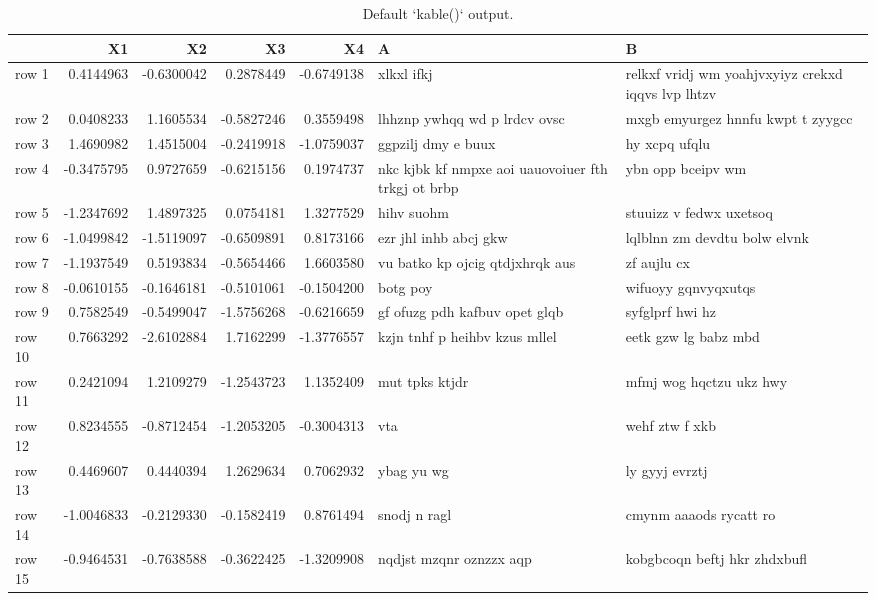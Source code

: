\documentclass[twoside]{extreport}
\begin{document}
\begin{table}

\caption{\label{tab:kable}Default `kable()` output.}
\centering
\begin{tabular}[t]{l|r|r|r|r|l|l}
\hline
  & X1 & X2 & X3 & X4 & A & B\\
\hline
row 1 & 0.4144963 & -0.6300042 & 0.2878449 & -0.6749138 & xlkxl ifkj & relkxf vridj wm yoahjvxyiyz crekxd iqqvs lvp lhtzv\\
\hline
row 2 & 0.0408233 & 1.1605534 & -0.5827246 & 0.3559498 & lhhznp ywhqq wd p lrdcv ovsc & mxgb emyurgez hnnfu kwpt t zyygcc\\
\hline
row 3 & 1.4690982 & 1.4515004 & -0.2419918 & -1.0759037 & ggpzilj dmy e buux & hy xcpq ufqlu\\
\hline
row 4 & -0.3475795 & 0.9727659 & -0.6215156 & 0.1974737 & nkc kjbk kf nmpxe aoi uauovoiuer fth trkgj ot brbp & ybn opp bceipv wm\\
\hline
row 5 & -1.2347692 & 1.4897325 & 0.0754181 & 1.3277529 & hihv suohm & stuuizz v fedwx uxetsoq\\
\hline
row 6 & -1.0499842 & -1.5119097 & -0.6509891 & 0.8173166 & ezr jhl inhb abcj gkw & lqlblnn zm devdtu bolw elvnk\\
\hline
row 7 & -1.1937549 & 0.5193834 & -0.5654466 & 1.6603580 & vu batko kp ojcig qtdjxhrqk aus & zf aujlu cx\\
\hline
row 8 & -0.0610155 & -0.1646181 & -0.5101061 & -0.1504200 & botg poy & wifuoyy gqnvyqxutqs\\
\hline
row 9 & 0.7582549 & -0.5499047 & -1.5756268 & -0.6216659 & gf ofuzg pdh kafbuv opet glqb & syfglprf hwi hz\\
\hline
row 10 & 0.7663292 & -2.6102884 & 1.7162299 & -1.3776557 & kzjn tnhf p heihbv kzus mllel & eetk gzw lg babz mbd\\
\hline
row 11 & 0.2421094 & 1.2109279 & -1.2543723 & 1.1352409 & mut tpks ktjdr & mfmj wog hqctzu ukz hwy\\
\hline
row 12 & 0.8234555 & -0.8712454 & -1.2053205 & -0.3004313 & vta & wehf ztw f xkb\\
\hline
row 13 & 0.4469607 & 0.4440394 & 1.2629634 & 0.7062932 & ybag yu wg & ly gyyj evrztj\\
\hline
row 14 & -1.0046833 & -0.2129330 & -0.1582419 & 0.8761494 & snodj n ragl & cmynm aaaods rycatt ro\\
\hline
row 15 & -0.9464531 & -0.7638588 & -0.3622425 & -1.3209908 & nqdjst mzqnr oznzzx aqp & kobgbcoqn beftj hkr zhdxbufl\\

\end{tabular}
\end{table}
\end{document}
